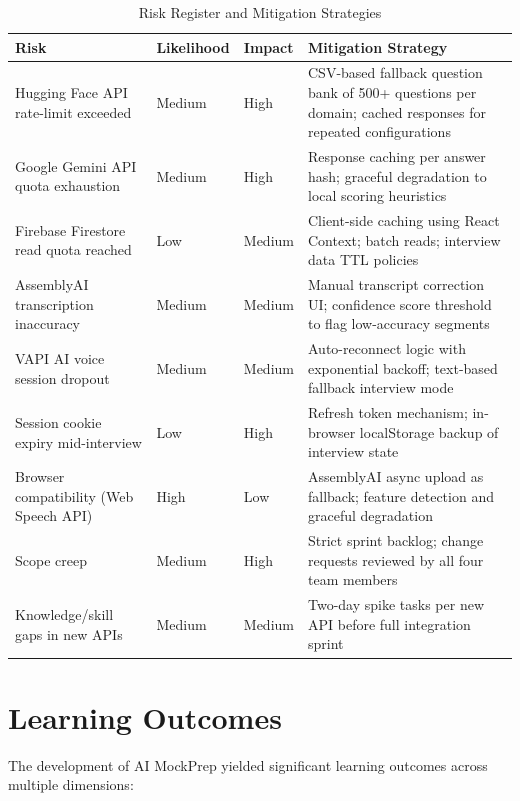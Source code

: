 \documentclass[12pt,a4paper,oneside]{report}
\begin{document}
\begin{table}[H]
\centering
\caption{Risk Register and Mitigation Strategies}
\label{tab:risks}
\begin{tabular}{|p{3.5cm}|p{1.5cm}|p{1.5cm}|p{6.5cm}|}
\hline
\textbf{Risk} & \textbf{Likelihood} & \textbf{Impact} & \textbf{Mitigation Strategy} \\
\hline
Hugging Face API rate-limit exceeded & Medium & High & CSV-based fallback question bank of 500+ questions per domain; cached responses for repeated configurations \\
\hline
Google Gemini API quota exhaustion & Medium & High & Response caching per answer hash; graceful degradation to local scoring heuristics \\
\hline
Firebase Firestore read quota reached & Low & Medium & Client-side caching using React Context; batch reads; interview data TTL policies \\
\hline
AssemblyAI transcription inaccuracy & Medium & Medium & Manual transcript correction UI; confidence score threshold to flag low-accuracy segments \\
\hline
VAPI AI voice session dropout & Medium & Medium & Auto-reconnect logic with exponential backoff; text-based fallback interview mode \\
\hline
Session cookie expiry mid-interview & Low & High & Refresh token mechanism; in-browser localStorage backup of interview state \\
\hline
Browser compatibility (Web Speech API) & High & Low & AssemblyAI async upload as fallback; feature detection and graceful degradation \\
\hline
Scope creep & Medium & High & Strict sprint backlog; change requests reviewed by all four team members \\
\hline
Knowledge/skill gaps in new APIs & Medium & Medium & Two-day spike tasks per new API before full integration sprint \\
\hline
\end{tabular}
\end{table}


\section{Learning Outcomes}
\label{sec:learning}

The development of AI MockPrep yielded significant learning outcomes across multiple dimensions:
\end{document}
